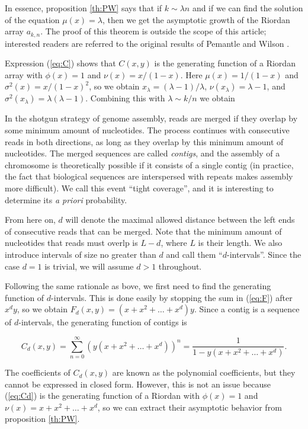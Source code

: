 \documentclass{article}
\begin{document}
In essence, proposition \ref{th:PW} says that if $k \sim \lambda n$ and if
we can find the solution of the equation $\mu(x) = \lambda$, then we get
the asymptotic growth of the Riordan array $a_{k,n}$. The proof of this
theorem is outside the scope of this article; interested readers are
referred to the original results of Pemantle and Wilson
\cite{PemWil02,AnalComb2013}.

Expression (\ref{eq:C}) shows that $C(x,y)$ is the generating function of
a Riordan array with $\phi(x) = 1$ and $\nu(x) = x/(1-x)$.  Here $\mu(x) =
1/(1-x)$ and $\sigma^2(x) = x/(1-x)^2$, so we obtain $x_\lambda = (\lambda
-1)/\lambda$, $\nu(x_\lambda) = \lambda -1$, and $\sigma^2(x_\lambda) =
\lambda(\lambda-1)$. Combining this with $\lambda \sim k/n$ we obtain

In the shotgun strategy of genome assembly, reads are merged if they
overlap by some minimum amount of nucleotides. The process continues with
consecutive reads in both directions, as long as they overlap by this
minimum amount of nucleotides. The merged sequences are called
\emph{contigs}, and the assembly of a chromosome is theoretically possible
if it consists of a single contig (in practice, the fact that biological
sequences are interspersed with repeats makes assembly more difficult). We
call this event ``tight coverage'', and it is interesting to determine
its \textit{a priori} probability.

From here on, $d$ will denote the maximal allowed distance between the
left ends of consecutive reads that can be merged. Note that the minimum
amount of nucleotides that reads must overlp is $L-d$, where $L$ is their
length. We also introduce intervals of size no greater than $d$ and call
them ``$d$-intervals''. Since the case $d=1$ is trivial, we will assume $d
> 1$ throughout.

Following the same rationale as bove, we first need to find the generating
function of $d$-intervals. This is done easily by stopping the sum in
(\ref{eq:F}) after $x^dy$, so we obtain $F_d(x,y) = (x+x^2+\ldots+x^d)y$.
Since a contig is a sequence of $d$-intervals, the generating function of
contigs is

\begin{equation}
\label{eq:Cd}
C_d(x,y) = \sum_{n=0}^\infty \left(y(x+x^2+\ldots+x^d)\right)^n =
\frac{1}{1-y(x+x^2+\ldots+x^d)}.
\end{equation}

The coefficients of $C_d(x,y)$ are known as the polynomial coefficients,
but they cannot be expressed in closed form. However, this is not an issue
because (\ref{eq:Cd}) is the generating function of a Riordan with
$\phi(x) = 1$ and $\nu(x) = x + x^2 + \ldots + x^d$, so we can extract
their asymptotic behavior from proposition \ref{th:PW}.
\end{document}
